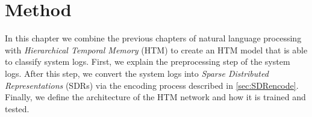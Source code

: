 \chapter{Method}
\label{chp_method}
In this chapter we combine the previous chapters of natural language processing with \textit{Hierarchical Temporal Memory} (HTM) to create an HTM model that is able to classify system logs. First, we explain the preprocessing step of the system logs. After this step, we convert the system logs into \textit{Sparse Distributed Representations} (SDRs) via the encoding process described in \autoref{sec:SDRencode}. Finally, we define the architecture of the HTM network and how it is trained and tested.







